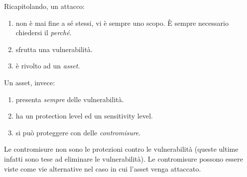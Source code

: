 Ricapitolando, un attacco:
\begin{enumerate}
	\item non è mai fine a sé stessi, vi è sempre uno scopo. È sempre necessario chiedersi il \textit{perché}.
	\item sfrutta una vulnerabilità.
	\item è rivolto ad un \textit{asset}.
\end{enumerate}
Un asset, invece:
\begin{enumerate}
	\item presenta \textit{sempre} delle vulnerabilità.
	\item ha un protection level ed un sensitivity level.
	\item si può proteggere con delle \textit{contromisure}.
\end{enumerate}
Le contromisure non sono le protezioni contro le vulnerabilità (queste ultime infatti sono tese ad eliminare le vulnerabilità). Le contromisure possono essere viste come vie alternative nel caso in cui l'asset venga attaccato.